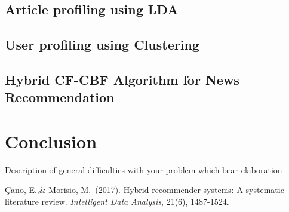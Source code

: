 \documentclass{article}
\begin{document}
\subsection{Article profiling using LDA}

\subsection{User profiling using Clustering}

\subsection{Hybrid CF-CBF Algorithm for News Recommendation}

\section{Conclusion}

{Description of general difficulties with your problem which bear elaboration
}

\begin{thebibliography}{9}

 Çano, E.,\& Morisio, M.\ (2017). Hybrid recommender systems: A systematic literature review. {\it Intelligent Data Analysis}, 21(6), 1487-1524.
\end{thebibliography}
\end{document}
